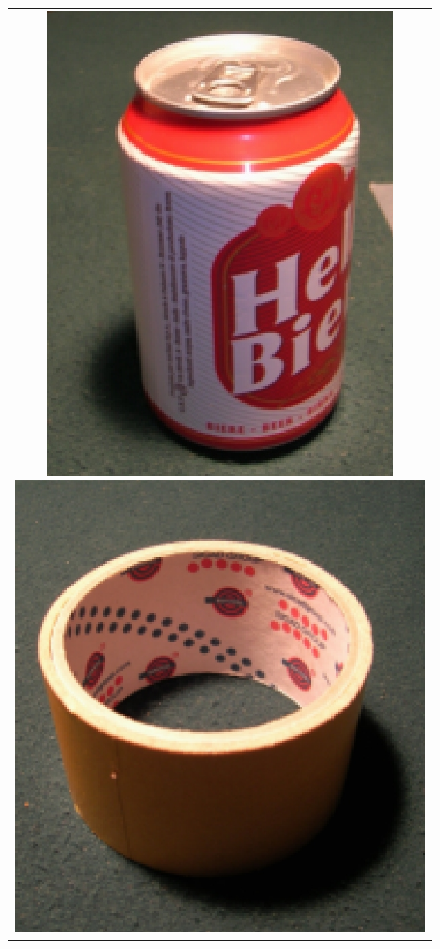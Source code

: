 \begin{figure}[!ht]
\begin{center}
\begin{tabular}{c}
      \includegraphics[height=0.08\textheight]{figs/grasping/beer.jpg}
      \includegraphics[height=0.08\textheight]{figs/grasping/scotch.jpg}

\end{tabular}
\end{center}
\end{figure}

